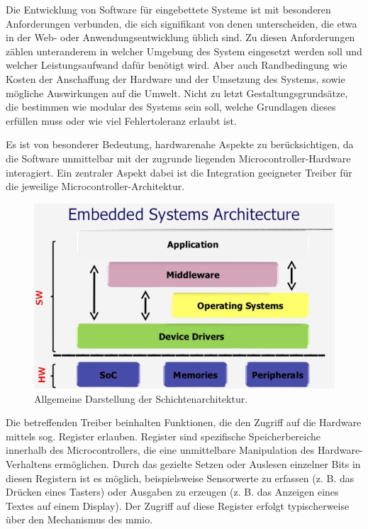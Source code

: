 Die Entwicklung von Software für eingebettete Systeme ist mit besonderen Anforderungen verbunden, die sich signifikant von denen unterscheiden, die etwa in der Web- oder Anwendungsentwicklung üblich sind.
Zu diesen Anforderungen zählen unteranderem in welcher Umgebung des System eingesetzt werden soll und welcher Leistungsaufwand dafür benötigt wird.
Aber auch Randbedingung wie Kosten der Anschaffung der Hardware und der Umsetzung des Systems, sowie mögliche Auswirkungen auf die Umwelt.
Nicht zu letzt Gestaltungsgrundsätze, die bestimmen wie modular des Systems sein soll, welche Grundlagen dieses erfüllen muss oder wie viel Fehlertoleranz erlaubt ist.

Es ist von besonderer Bedeutung, hardwarenahe Aspekte zu berücksichtigen, da die Software unmittelbar mit der zugrunde liegenden Microcontroller-Hardware interagiert.
Ein zentraler Aspekt dabei ist die Integration geeigneter Treiber für die jeweilige Microcontroller-Architektur.
\begin{figure}[H]
	\includegraphics[width=\textwidth]{Pics/embedded_layer_architecture.png}
	\caption{Allgemeine Darstellung der Schichtenarchitektur.\cite{RichardsFord2020}}
	\label{fig:embedded_layer_architecture}
\end{figure}
Die betreffenden Treiber beinhalten Funktionen, die den Zugriff auf die Hardware mittels sog. Register erlauben.
Register sind spezifische Speicherbereiche innerhalb des Microcontrollers, die eine unmittelbare Manipulation des Hardware-Verhaltens ermöglichen.
Durch das gezielte Setzen oder Auslesen einzelner Bits in diesen Registern ist es möglich, beispielsweise Sensorwerte zu erfassen (z. B. das Drücken eines Tasters) oder Ausgaben zu erzeugen (z. B. das Anzeigen eines Textes auf einem Display).
Der Zugriff auf diese Register erfolgt typischerweise über den Mechanismus des \gls{mmio}. 

